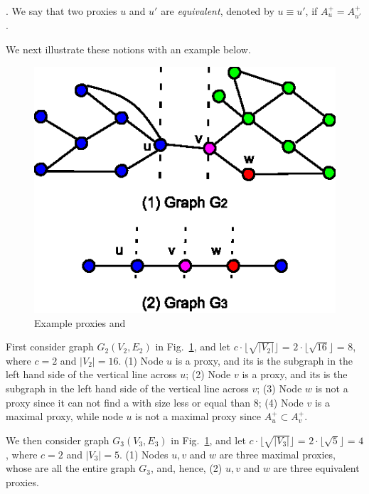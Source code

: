 . We say that two proxies $u$ and $u'$ are {\em equivalent}, denoted by $u\equiv u'$, if $A^+_{u} = A^+_{u'}$.




We next illustrate these notions with an example below.

\begin{figure}
\centering
 \includegraphics[scale=0.95]{./extended-proxies.eps}
 \vspace{-2ex}
 \caption{Example proxies and \dras}
  \label{fig-proxies}
\vspace{-3ex}
\end{figure}


\vspace{-0.5ex}
\begin{example}
\label{exm-proxies} First consider graph $G_2(V_2, E_2)$ in Fig.~\ref{fig-proxies}, and let $c\cdot\lfloor\sqrt{|V_2|}\rfloor$ =
$2\cdot\lfloor\sqrt{16}\rfloor$ = $8$, where $c = 2$ and $|V_2| = 16$.
\sstab(1) Node $u$ is a proxy, and its \dra is the subgraph in the left hand side of the vertical line across $u$;
\sstab(2) Node $v$ is a proxy, and its \dra is the subgraph in the left hand side of the vertical line across $v$;
\sstab(3) Node $w$ is not a proxy since it can not find a \dra with size less or equal than $8$;
\sstab(4)  Node $v$ is a maximal proxy, while node $u$ is not a maximal proxy since $A^+_u\subset A^+_v$.


We then consider graph $G_3(V_3, E_3)$ in Fig.~\ref{fig-proxies}, and let $c\cdot\lfloor\sqrt{|V_3|}\rfloor$ =
$2\cdot\lfloor\sqrt{5}\rfloor$ = $4$, where $c = 2$ and $|V_3| = 5$.
\sstab(1) Nodes $u, v$ and $w$ are three maximal proxies, whose \dras are all the entire graph $G_3$, and, hence,
\sstab(2) $u, v$ and $w$ are three equivalent proxies.
 \end{example}

